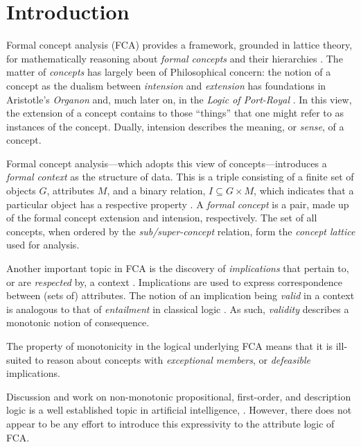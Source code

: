 \section{Introduction}
\label{section: introduction}

Formal concept analysis (FCA) provides a framework, grounded in lattice theory, for mathematically reasoning about \textit{formal concepts} and their hierarchies \cite{ganter1999formal,ganter2016conceptual,rudolph2007relational}. The matter of \textit{concepts} has largely been of Philosophical concern: the notion of a concept as the dualism between \textit{intension} and \textit{extension} has foundations in Aristotle's \textit{Organon} and, much later on, in the \textit{Logic of Port-Royal} \cite{rudolph2007relational,castonguay2012meaning}. In this view, the extension of a concept contains to those ``things'' that one might refer to as instances of the concept. Dually, intension describes the meaning, or \textit{sense}, of a concept.

Formal concept analysis---which adopts this view of concepts---introduces a \textit{formal context} as the structure of data. This is a triple consisting of a finite set of objects $G$, attributes $M$, and a binary relation, $I \subseteq G\times M$, which indicates that a particular object has a respective property \cite{ganter1999formal,ganter2016conceptual}. A \textit{formal concept} is a pair, made up of the formal concept extension and intension, respectively. The set of all concepts, when ordered by the \textit{sub/super-concept} relation, form the \textit{concept lattice} used for analysis.

Another important topic in FCA is the discovery of \textit{implications} that pertain to, or are \textit{respected} by, a context \cite{rudolph2007relational,ganter1999formal}. Implications are used to express correspondence between (sets of) attributes. The notion of an implication being \textit{valid} in a context is analogous to that of \textit{entailment} in classical logic \cite{ganter2016conceptual}. As such, \textit{validity} describes a monotonic notion of consequence.

The property of monotonicity in the logical underlying FCA means that it is ill-suited to reason about concepts with \textit{exceptional members}, or \textit{defeasible} implications.

Discussion and work on non-monotonic propositional, first-order, and description logic is a well established topic in artificial intelligence, \cite{ferguson2003monotonicity,giordano2015semantic,kraus1990nonmonotonic,lehmann1994what,shoham1987nonmonotonic}. However, there does not appear to be any effort to introduce this expressivity to the attribute logic of FCA.


